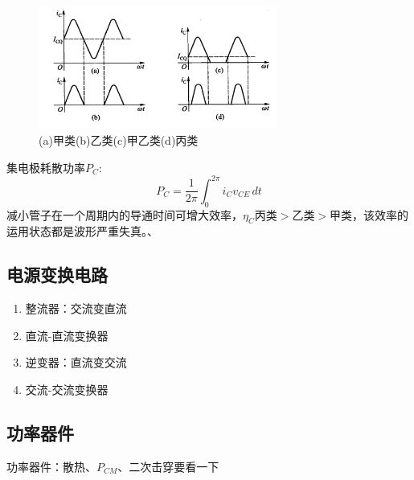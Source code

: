 \documentclass[10pt]{article}
\begin{document}
\begin{figure}[H] %
 \centering %
 \includegraphics[width=0.7\textwidth]{pictures/2-1.png} %
 \caption{(a)甲类\quad(b)乙类\quad(c)甲乙类\quad(d)丙类 } %
 \label{fig.1-1} %
 \end{figure}

 集电极耗散功率$P_C$:
 \begin{equation}
   P_C = \frac{1}{2\pi} \int_{0}^{2\pi} i_Cv_{CE} \, dt
\end{equation}
减小管子在一个周期内的导通时间可增大效率，$\eta_C$丙类$>$乙类$>$甲类，该效率的运用状态都是波形严重失真。、
\par
\subsection{电源变换电路}
\normalsize
\begin{enumerate}
    \item 整流器：交流变直流
    \item 直流-直流变换器
    \item 逆变器：直流变交流
    \item 交流-交流变换器
\end{enumerate}
\subsection{功率器件}
功率器件：散热、$P_{CM}$、二次击穿要看一下
\end{document}
